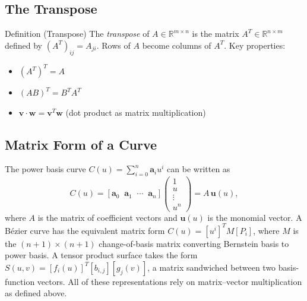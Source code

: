 \subsection*{The Transpose}

\begin{propositionbox}{Definition (Transpose)}
The \emph{transpose} of $A \in \mathbb{R}^{m \times n}$ is the matrix
$A^T \in \mathbb{R}^{n \times m}$ defined by $(A^T)_{ij} = A_{ji}$.
Rows of $A$ become columns of $A^T$.
Key properties:
\begin{itemize}
  \item $(A^T)^T = A$
  \item $(AB)^T = B^T A^T$
  \item $\mathbf{v} \cdot \mathbf{w} = \mathbf{v}^T \mathbf{w}$ (dot product as matrix multiplication)
\end{itemize}
\end{propositionbox}

\subsection*{Matrix Form of a Curve}

\begin{remark*}
The power basis curve $C(u) = \sum_{i=0}^n \mathbf{a}_i u^i$ can be written as
\[
  C(u) = [\mathbf{a}_0 \;\; \mathbf{a}_1 \;\; \cdots \;\; \mathbf{a}_n]
  \begin{pmatrix} 1 \\ u \\ \vdots \\ u^n \end{pmatrix}
  = A \,\mathbf{u}(u),
\]
where $A$ is the matrix of coefficient vectors and $\mathbf{u}(u)$ is the monomial
vector.
A B\'{e}zier curve has the equivalent matrix form $C(u) = [u^i]^T M [P_i]$,
where $M$ is the $(n+1)\times(n+1)$ change-of-basis matrix converting
Bernstein basis to power basis.
A tensor product surface takes the form
$S(u,v) = [f_i(u)]^T [b_{i,j}] [g_j(v)]$,
a matrix sandwiched between two basis-function vectors.
All of these representations rely on matrix--vector multiplication as
defined above.
\end{remark*}
